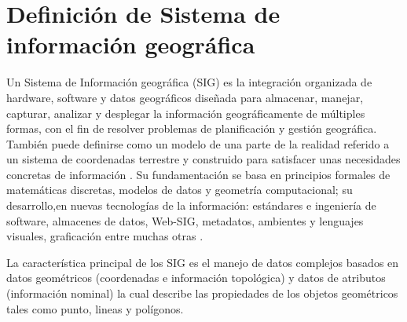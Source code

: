 \section{Definición de Sistema de información geográfica}
\label{sec:cap2-definicion-sig}

Un Sistema de Información geográfica (SIG) es la integración organizada de hardware, software y datos geográficos
diseñada para almacenar, manejar, capturar, analizar y desplegar la información geográficamente de múltiples
formas, con el fin de resolver problemas de planificación y gestión geográfica. También puede definirse como un
modelo de una parte de la realidad referido a un sistema de coordenadas terrestre y construido para satisfacer 
unas necesidades concretas de información \cite{lopezMarcos2007}. Su fundamentación se basa en principios formales
de matemáticas discretas, modelos de datos y geometría computacional; su desarrollo,en nuevas tecnologías de la
información: estándares e ingeniería de software, almacenes de datos, Web-SIG, metadatos, ambientes y lenguajes
visuales, graficación entre muchas otras \cite{lunaPaulina2010}.

La característica principal de los SIG es el manejo de datos complejos basados en datos geométricos (coordenadas e
información topológica) y datos de atributos (información nominal) la cual describe las propiedades de los objetos
geométricos tales como punto, lineas y polígonos.
